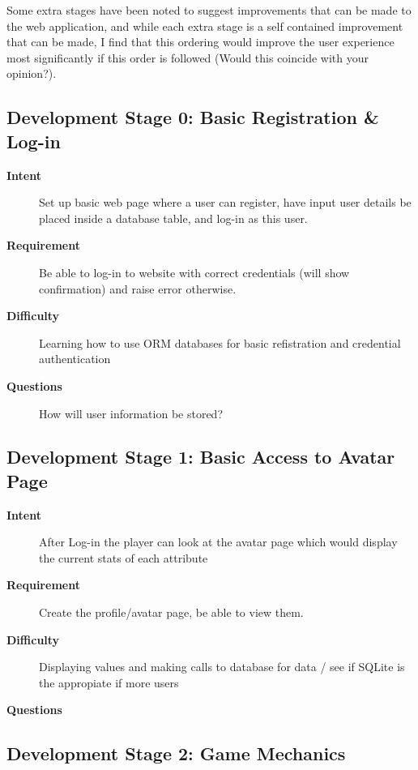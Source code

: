 \documentclass[11pt, a4paper]{article}
\begin{document}
Some extra stages have been noted to suggest improvements that can be made to the web application, and while each extra stage is a self contained improvement that can be made, I find that this ordering would improve the user experience most significantly if this order is followed (Would this coincide with your opinion?).

\subsection{Development Stage 0: Basic Registration \& Log-in}

\begin{description}
\item[\textbf{Intent}] Set up basic web page where a user can register, have input user details be placed inside a database table, and log-in as this user.
\item[\textbf{Requirement}] Be able to log-in to website with correct credentials (will show confirmation) and raise error otherwise.
\item[\textbf{Difficulty}] Learning how to use ORM databases for basic refistration and credential authentication
\item[\textbf{Questions}] How will user information be stored?
\end{description}

\subsection{Development Stage 1: Basic Access to Avatar Page}

\begin{description}
\item[\textbf{Intent}] After Log-in the player can look at the avatar page which would display the current stats of each attribute
\item[\textbf{Requirement}] Create the profile/avatar page, be able to view them.
\item[\textbf{Difficulty}] Displaying values and making calls to database for data / see if SQLite is the appropiate if more users 
\item[\textbf{Questions}]
\end{description}

\subsection{Development Stage 2: Game Mechanics}
\end{document}
